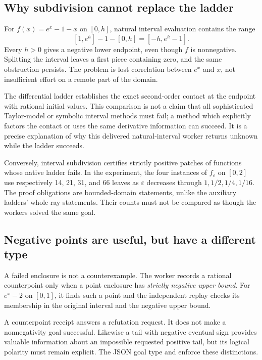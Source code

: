 \subsection{Why subdivision cannot replace the ladder}

For $f(x)=e^x-1-x$ on $[0,h]$, natural interval evaluation contains the range
\[
 [1,e^h]-1-[0,h]=[-h,e^h-1].
\]
Every $h>0$ gives a negative lower endpoint, even though $f$ is nonnegative.
Splitting the interval leaves a first piece containing zero, and the same
obstruction persists. The problem is lost correlation between $e^x$ and $x$,
not insufficient effort on a remote part of the domain.

The differential ladder establishes the exact second-order contact at the
endpoint with rational initial values. This comparison is not a claim that
all sophisticated Taylor-model or symbolic interval methods must fail; a
method which explicitly factors the contact or uses the same derivative
information can succeed. It is a precise explanation of why this delivered
natural-interval worker returns unknown while the ladder succeeds.

Conversely, interval subdivision certifies strictly positive patches of
functions whose native ladder fails. In the experiment, the four instances
of $f_\varepsilon$ on $[0,2]$ use respectively 14, 21, 31, and 66 leaves as
$\varepsilon$ decreases through $1,1/2,1/4,1/16$. The proof obligations are
bounded-domain statements, unlike the auxiliary ladders' whole-ray statements.
Their counts must not be compared as though the workers solved the same goal.

\subsection{Negative points are useful, but have a different type}

A failed enclosure is not a counterexample. The worker records a rational
counterpoint only when a point enclosure has \emph{strictly negative upper
bound}. For $e^x-2$ on $[0,1]$, it finds such a point and the independent replay
checks its membership in the original interval and the negative upper bound.

A counterpoint receipt answers a refutation request. It does not make a
nonnegativity goal successful. Likewise a tail with negative eventual sign
provides valuable information about an impossible requested positive tail, but
its logical polarity must remain explicit. The JSON goal type and
 enforce these distinctions.
